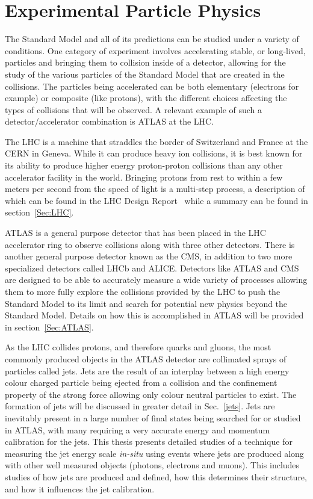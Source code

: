 \section{Experimental Particle Physics}
\label{Sec:Experi}
The Standard Model and all of its predictions can be studied under a variety of conditions.  
One category of experiment involves accelerating stable, or long-lived, particles and bringing them to collision inside of a detector, allowing for the study of the various particles of the Standard Model that are created in the collisions.  
The particles being accelerated can be both elementary (electrons for example) or composite (like protons), with the different choices affecting the types of collisions that will be observed.  
A relevant example of such a detector/accelerator combination is \gls{ATLAS} at the \gls{LHC}.  

The \gls{LHC} is a machine that straddles the border of Switzerland and France at the \gls{CERN} in Geneva.  
While it can produce heavy ion collisions, it is best known for its ability to produce higher energy proton-proton collisions than any other accelerator facility in the world.   
Bringing protons from rest to within a few meters per second from the speed of light is a multi-step process, a description of which can be found in the LHC Design Report~\cite{LHCDesignReport} while a summary can be found in section~\ref{Sec:LHC}.  

\gls{ATLAS} is a general purpose detector that has been placed in the LHC accelerator ring to observe collisions along with three other detectors.  
There is another general purpose detector known as the \gls{CMS}, in addition to two more specialized detectors called \gls{LHCb} and \gls{ALICE}.  
Detectors like \gls{ATLAS} and \gls{CMS} are designed to be able to accurately measure a wide variety of processes allowing them to more fully explore the collisions provided by the \gls{LHC} to push the Standard Model to its limit and search for potential new physics beyond the Standard Model.  
Details on how this is accomplished in ATLAS will be provided in section~\ref{Sec:ATLAS}.  

As the \gls{LHC} collides protons, and therefore quarks and gluons, the most commonly produced objects in the \gls{ATLAS} detector are collimated sprays of particles called jets.  
Jets are the result of an interplay between a high energy colour charged particle being ejected from a collision and the confinement property of the strong force allowing only colour neutral particles to exist.  
The formation of jets will be discussed in greater detail in Sec.~\ref{jets}.  
Jets are inevitably present in a large number of final states being searched for or studied in ATLAS, with many requiring a very accurate energy and momentum calibration for the jets.  
This thesis presents detailed studies of a technique for measuring the jet energy scale \textit{in-situ} using events where jets are produced along with other well measured objects (photons, electrons and muons).  
This includes studies of how jets are produced and defined, how this determines their structure, and how it influences the jet calibration.  


